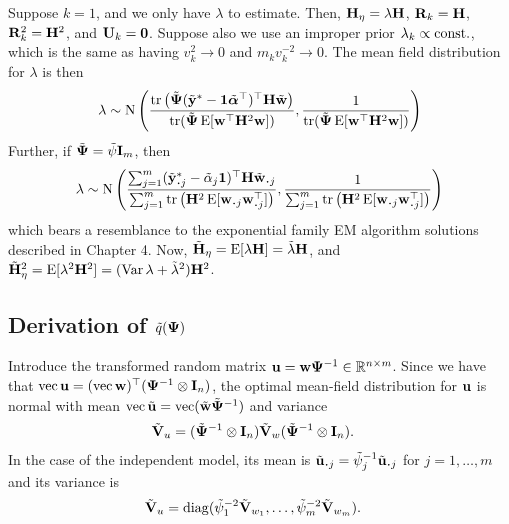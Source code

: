 \begin{example}
  Suppose $k=1$, and we only have $\lambda$ to estimate.
  Then, ${\mathbf H}_\eta = \lambda {\mathbf H}$, ${\mathbf R}_k = {\mathbf H}$, ${\mathbf R}_k^2 = {\mathbf H}^2$, and ${\mathbf U}_k = {\mathbf 0}$.
  Suppose also we use an improper prior $\lambda_k \propto \text{const.}\hspace{0.01em}$, which is the same as having $v_k^2 \to 0$ and $m_k v_k^{-2} \to 0$.
  The mean field distribution for $\lambda$ is then
  \[
    \lambda \sim \operatorname{N} \left( 
    \frac{\operatorname{tr}\big(\tilde{{\bm\Psi}}(\tilde{{\mathbf y}}^* - {\mathbf 1}\tilde{{\bm\alpha}}^\top)^\top {\mathbf H} \tilde{{\mathbf w}} \big)}{\operatorname{tr}(\tilde{{\bm\Psi}}\operatorname{E}[{\mathbf w}^\top{\mathbf H}^2{\mathbf w}])},
    \frac{1}{\operatorname{tr}(\tilde{{\bm\Psi}}\operatorname{E}[{\mathbf w}^\top{\mathbf H}^2{\mathbf w}])}
    \right)
  \]
  Further, if $\tilde{{\bm\Psi}} = \tilde\psi{\mathbf I}_m$, then
  \[
    \lambda \sim \N \left( 
    \frac{\sum_{j=1}^m (\tilde\by^*_{\bigcdot j} - \tilde\alpha_j\bone)^\top \bH \tilde\bw_{\bigcdot j} }{\sum_{j=1}^m
  \tr \big( \bH^2 \E [\bw_{\bigcdot j} \bw_{\bigcdot j}^\top] \big)},
    \frac{1}{\sum_{j=1}^m
  \tr \big( \bH^2 \E [\bw_{\bigcdot j} \bw_{\bigcdot j}^\top] \big)}
    \right)
  \]
  which bears a resemblance to the exponential family EM algorithm solutions described in Chapter 4.
  Now, $\tilde {{\mathbf H}}_\eta = \operatorname{E}[\lambda {\mathbf H}] = \tilde\lambda {\mathbf H}$, and $\tilde {{\mathbf H}}_\eta^2 = \operatorname{E}[\lambda^2 {\mathbf H}^2] = (\operatorname{Var}\lambda + \tilde\lambda^2) {\mathbf H}^2$.
\end{example}

\subsection{Derivation of \texorpdfstring{$\tilde q({\bm\Psi})$}{$\tilde q(\Psi)$}}

Introduce the transformed random matrix ${\mathbf u} = {\mathbf w}{\bm\Psi}^{-1} \in \mathbb{R}^{n\times m}$.
Since we have that  $\operatorname{vec} {\mathbf u} = (\operatorname{vec} {\mathbf w})^\top ({\bm\Psi}^{-1} \otimes {\mathbf I}_n)$, the optimal mean-field distribution for ${\mathbf u}$ is normal with mean $\operatorname{vec} \tilde{{\mathbf u}} = \operatorname{vec} (\tilde{{\mathbf w}}\tilde{{\bm\Psi}}^{-1} )$ and variance
\begin{align*}
  \tilde {{\mathbf V}}_u
  &= (\tilde{{\bm\Psi}}^{-1} \otimes {\mathbf I}_n) \tilde {{\mathbf V}}_w (\tilde{{\bm\Psi}}^{-1} \otimes {\mathbf I}_n). 
\end{align*}
In the case of the independent model, its mean is $\tilde\bu_{\bigcdot j} = \tilde\psi_j^{-1} \tilde\bu_{\bigcdot j}$ for $j=1,\dots,m$ and its variance is
\begin{align*}
  \tilde {{\mathbf V}}_u 
  &= \operatorname{diag}(\tilde\psi_1^{-2}\tilde{{\mathbf V}}_{w_1},\dots,\tilde\psi_m^{-2}\tilde{{\mathbf V}}_{w_m}).
\end{align*}

